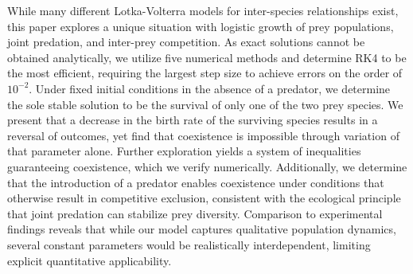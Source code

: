 While many different Lotka-Volterra models for inter-species relationships exist, this paper explores a unique situation with logistic growth of prey populations, joint predation, and inter-prey competition. 
As exact solutions cannot be obtained analytically, we utilize five numerical methods and determine RK4 to be the most efficient, requiring the largest step size to achieve errors on the order of $10^{-2}$. 
Under fixed initial conditions in the absence of a predator, we determine the sole stable solution to be the survival of only one of the two prey species. 
We present that a decrease in the birth rate of the surviving species results in a reversal of outcomes, yet find that coexistence is impossible through variation of that parameter alone. 
Further exploration yields a system of inequalities guaranteeing coexistence, which we verify numerically. 
Additionally, we determine that the introduction of a predator enables coexistence under conditions that otherwise result in competitive exclusion, consistent with the ecological principle that joint predation can stabilize prey diversity. 
Comparison to experimental findings reveals that while our model captures qualitative population dynamics, several constant parameters would be realistically interdependent, limiting explicit quantitative applicability.